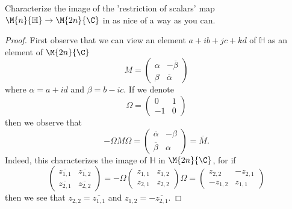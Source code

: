 \documentclass[10pt]{amsart}
\begin{document}
\begin{ex}
  Characterize the image of the 'restriction of scalars' map $\M{n}{\mathbb{H}} \rightarrow \M{2n}{\C}$ in as nice of a way as you can.
  \begin{proof}
    First observe that we can view an element $a + ib + jc + kd$ of $\mathbb{H}$ as an element of $\M{2n}{\C}$
    $$M = \left(\begin{matrix}
      \alpha & -\overline{\beta}\\
      \beta & \overline{\alpha}
    \end{matrix}\right)$$
    where $\alpha = a + id$ and $\beta = b - ic$.
    If we denote 
    $$\Omega = \left(\begin{matrix}
      0 & 1\\
      -1 & 0
    \end{matrix}\right)$$
    then we observe that
    $$-\Omega M \Omega = 
    \left(\begin{matrix}
      \overline{\alpha} & -\beta\\
      \overline{\beta} & \alpha
    \end{matrix}\right)
    = \overline{M}.$$
    Indeed, this characterizes the image of $\mathbb{H}$ in $\M{2n}{\C}$, for if
    $$\left(\begin{matrix}
    \overline{z_{1,1}} & \overline{z_{1,2}}\\
    \overline{z_{2,1}} & \overline{z_{2,2}}
    \end{matrix}\right) 
    = 
    -\Omega \left(\begin{matrix}
      z_{1,1} & z_{1,2}\\
      z_{2,1} & z_{2,2}
    \end{matrix}\right)
    \Omega
    = 
    \left(\begin{matrix}
      z_{2,2} & -z_{2,1}\\
      -z_{1,2} & z_{1,1}
    \end{matrix}\right)$$
    then we see that $z_{2,2} = \overline{z_{1,1}}$ and $z_{1,2} = -\overline{z_{2,1}}$.
    

\end{proof}
\end{ex}
\end{document}
